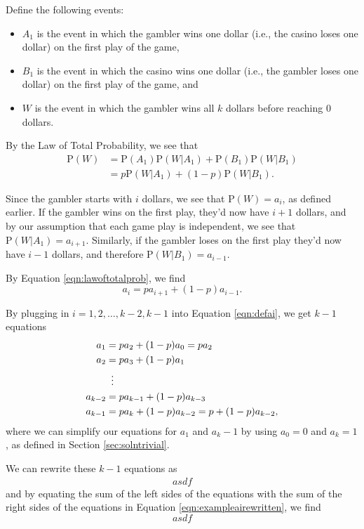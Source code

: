 \documentclass[a4paper,11pt]{article}
\newcommand{\Prob}{\mathrm{P}}
\begin{document}
Define the following events:
\begin{itemize}
\item $A_1$ is the event in which the gambler wins one dollar (i.e., the casino loses one dollar) on the first play of the game,
\item $B_1$ is the event in which the casino wins one dollar (i.e., the gambler loses one dollar) on the first play of the game, and
\item $W$ is the event in which the gambler wins all $k$ dollars before reaching $0$ dollars.
\end{itemize}

By the Law of Total Probability, we see that
\begin{align}
\Prob(W)&=\Prob(A_1)\Prob(W|A_1)+\Prob(B_1)\Prob(W|B_1) \nonumber 
\\
&=p\Prob(W|A_1)+(1-p)\Prob(W|B_1).
\label{eqn:lawoftotalprob}
\end{align}

Since the gambler starts with $i$ dollars, we see that $\Prob(W)=a_i$, as defined earlier. If the gambler wins on the first play, they'd now have $i+1$ dollars, and by our assumption that each game play is independent, we see that $\Prob(W|A_1)=a_{i+1}$. Similarly, if the gambler loses on the first play they'd now have $i-1$ dollars, and therefore $\Prob(W|B_1)=a_{i-1}$.

By Equation \ref{eqn:lawoftotalprob}, we find
\begin{equation}
a_i=p a_{i+1} + (1-p) a_{i-1}.
\label{eqn:defai}
\end{equation}

By plugging in $i=1,2,\ldots,k-2,k-1$ into Equation \ref{eqn:defai}, we get $k-1$ equations
\begin{align}
a_1 &= p a_2 + (1-p) a_0 = p a_2 \nonumber
\\
a_2 &= p a_3 + (1-p) a_1 \nonumber
\\
& \vdotswithin{=} \nonumber
\\
a_{k-2} &= p a_{k-1} + (1-p) a_{k-3} \nonumber
\\
a_{k-1} &= p a_{k} + (1-p) a_{k-2} = p + (1-p) a_{k-2},
\label{eqn:exampleai}
\end{align}
where we can simplify our equations for $a_1$ and $a_k-1$ by using $a_0=0$ and $a_k=1$, as defined in Section \ref{sec:solntrivial}.

We can rewrite these $k-1$ equations as
\begin{align}
asdf
\label{eqn:exampleairewritten}
\end{align}
and by equating the sum of the left sides of the equations with the sum of the right sides of the equations in Equation \ref{eqn:exampleairewritten}, we find
\begin{equation}
asdf
\label{eqn:oneminaidefn}
\end{equation}
\end{document}
